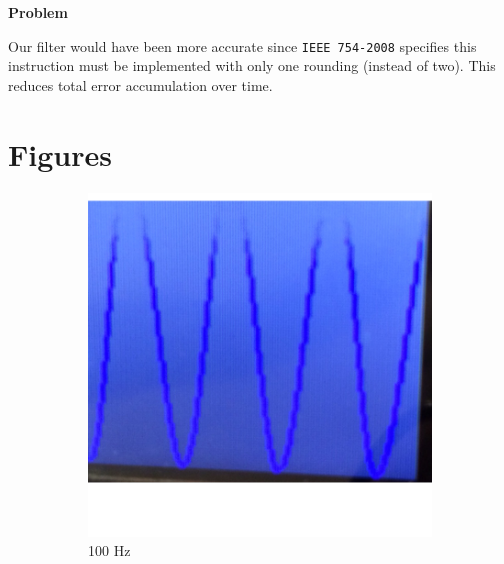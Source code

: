 \documentclass[12pt]{article}
\newenvironment{Ex}{\textbf{Problem}\vspace{.25em}\\}{}
\begin{document}
\begin{enumerate}[1)]
\begin{Ex}
\begin{solution}
      Our filter would have been more accurate since \verb|IEEE 754-2008|
      specifies this instruction must be implemented with only one
      rounding (instead of two). This reduces total error accumulation
      over time.
    \end{solution}
  \end{Ex}
\end{enumerate}

\newpage
\section{Figures}

\begin{figure}[H]
  \centering
  \begin{subfigure}[b]{0.3\textwidth}
    \includegraphics[width=\textwidth]{./img/raw_100Hz}
    \caption{100 Hz}
    \label{fig:raw_100}
  \end{subfigure}
  \begin{subfigure}[b]{0.3\textwidth}

\end{subfigure}
\end{figure}
\end{document}
